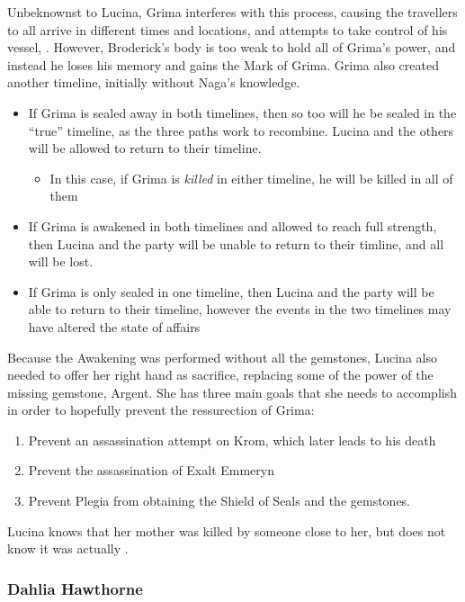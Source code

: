 Unbeknownst to Lucina, Grima interferes with this process, causing the travellers to all arrive in different times and locations, and attempts to take control of his vessel, . However, Broderick's body is too weak to hold all of Grima's power, and instead he loses his memory and gains the Mark of Grima. Grima also created another timeline, initially without Naga's knowledge. 
\begin{itemize}
\item If Grima is sealed away in both timelines, then so too will he be sealed in the ``true'' timeline, as the three paths work to recombine. Lucina and the others will be allowed to return to their timeline.
\begin{itemize}
\item In this case, if Grima is \textit{killed} in either timeline, he will be killed in all of them
\end{itemize}
\item If Grima is awakened in both timelines and allowed to reach full strength, then Lucina and the party will be unable to return to their timline, and all will be lost.
\item If Grima is only sealed in one timeline, then Lucina and the party will be able to return to their timeline, however the events in the two timelines may have altered the state of affairs
\end{itemize}

Because the Awakening was performed without all the gemstones, Lucina also needed to offer her right hand as sacrifice, replacing some of the power of the missing gemstone, Argent. She has three main goals that she needs to accomplish in order to hopefully prevent the ressurection of Grima:
\begin{enumerate}
\item Prevent an assassination attempt on Krom, which later leads to his death
\item Prevent the assassination of Exalt Emmeryn
\item Prevent Plegia from obtaining the Shield of Seals and the gemstones.
\end{enumerate}

Lucina knows that her mother was killed by someone close to her, but does not know it was actually .

\subsubsection{Dahlia Hawthorne}
\label{people:dahlia}

